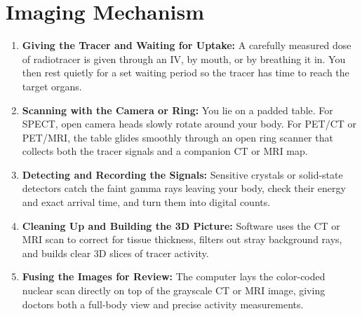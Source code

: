 \section{Imaging Mechanism}
\begin{enumerate}
  \item \textbf{Giving the Tracer and Waiting for Uptake:} A carefully measured dose of radiotracer is given through an IV, by mouth, or by breathing it in. You then rest quietly for a set waiting period so the tracer has time to reach the target organs.
  \item \textbf{Scanning with the Camera or Ring:} You lie on a padded table. For SPECT, open camera heads slowly rotate around your body. For PET/CT or PET/MRI, the table glides smoothly through an open ring scanner that collects both the tracer signals and a companion CT or MRI map.
  \item \textbf{Detecting and Recording the Signals:} Sensitive crystals or solid-state detectors catch the faint gamma rays leaving your body, check their energy and exact arrival time, and turn them into digital counts.
  \item \textbf{Cleaning Up and Building the 3D Picture:} Software uses the CT or MRI scan to correct for tissue thickness, filters out stray background rays, and builds clear 3D slices of tracer activity.
  \item \textbf{Fusing the Images for Review:} The computer lays the color-coded nuclear scan directly on top of the grayscale CT or MRI image, giving doctors both a full-body view and precise activity measurements.
\end{enumerate}

